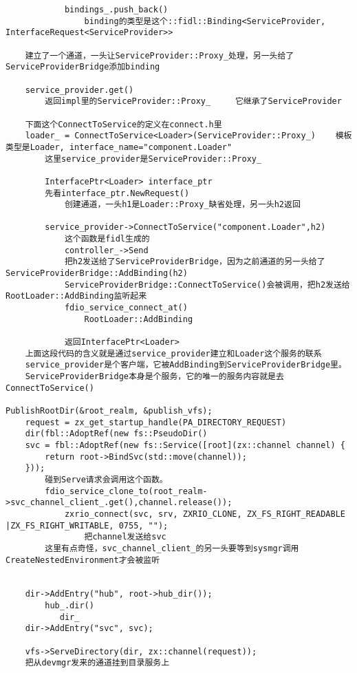 \begin{verbatim}
            bindings_.push_back()
                binding的类型是这个::fidl::Binding<ServiceProvider, InterfaceRequest<ServiceProvider>>

    建立了一个通道，一头让ServiceProvider::Proxy_处理，另一头给了ServiceProviderBridge添加binding

    service_provider.get()
        返回impl里的ServiceProvider::Proxy_     它继承了ServiceProvider
        
    下面这个ConnectToService的定义在connect.h里
    loader_ = ConnectToService<Loader>(ServiceProvider::Proxy_)    模板类型是Loader, interface_name="component.Loader"
        这里service_provider是ServiceProvider::Proxy_

        InterfacePtr<Loader> interface_ptr
        先看interface_ptr.NewRequest()
            创建通道，一头h1是Loader::Proxy_缺省处理，另一头h2返回

        service_provider->ConnectToService("component.Loader",h2)
            这个函数是fidl生成的
            controller_->Send
            把h2发送给了ServiceProviderBridge，因为之前通道的另一头给了ServiceProviderBridge::AddBinding(h2)
            ServiceProviderBridge::ConnectToService()会被调用，把h2发送给RootLoader::AddBinding监听起来
            fdio_service_connect_at()
                RootLoader::AddBinding

            返回InterfacePtr<Loader>
    上面这段代码的含义就是通过service_provider建立和Loader这个服务的联系
    service_provider是个客户端，它被AddBinding到ServiceProviderBridge里。
    ServiceProviderBridge本身是个服务，它的唯一的服务内容就是去ConnectToService()

PublishRootDir(&root_realm, &publish_vfs);
    request = zx_get_startup_handle(PA_DIRECTORY_REQUEST)
    dir(fbl::AdoptRef(new fs::PseudoDir()
    svc = fbl::AdoptRef(new fs::Service([root](zx::channel channel) {
        return root->BindSvc(std::move(channel));
    }));
        碰到Serve请求会调用这个函数。
        fdio_service_clone_to(root_realm->svc_channel_client_.get(),channel.release());
            zxrio_connect(svc, srv, ZXRIO_CLONE, ZX_FS_RIGHT_READABLE |ZX_FS_RIGHT_WRITABLE, 0755, "");
                把channel发送给svc
        这里有点奇怪，svc_channel_client_的另一头要等到sysmgr调用CreateNestedEnvironment才会被监听


    dir->AddEntry("hub", root->hub_dir());
        hub_.dir()
           dir_
    dir->AddEntry("svc", svc);

    vfs->ServeDirectory(dir, zx::channel(request));
    把从devmgr发来的通道挂到目录服务上


\end{verbatim}

